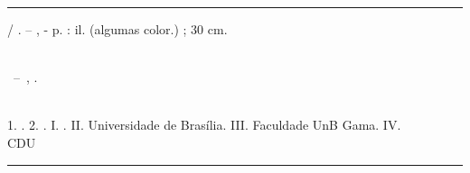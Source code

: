 \begin{fichacatalografica}
\vspace*{\fill} %
\hrule	%
\begin{center} %
\begin{minipage}[c]{12.5cm} %
\imprimirautor
\hspace{0.5cm} \imprimirtitulo / \imprimirautor. --
\imprimirlocal, \imprimirdata-
\hspace{0.5cm} \pageref{LastPage} p. : il. (algumas color.) ; 30 cm.\\
\hspace{0.5cm} \imprimirorientadorRotulo~\imprimirorientador\\
\hspace{0.5cm}
\parbox[t]{\textwidth}{\imprimirtipotrabalho~--~\imprimirinstituicao,
\imprimirdata.}\\
\hspace{0.5cm}
1. \imprimirpalavrachaveum.
2. \imprimirpalavrachavedois.
I. \imprimirorientador.
II. Universidade de Brasília.
III. Faculdade UnB Gama.
IV. \imprimirtitulo\\
\hspace{8.75cm} CDU \nomecdu\\
\end{minipage}
\end{center}
\hrule
\end{fichacatalografica}